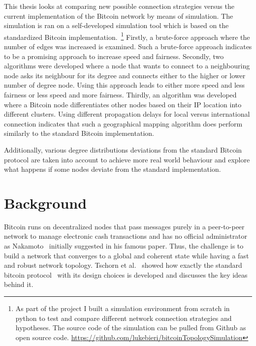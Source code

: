 \documentclass[a4paper, oneside]{discothesis}
\begin{document}
This thesis looks at comparing new possible connection strategies versus the current implementation of the Bitcoin network by means of simulation. The simulation is ran on a self-developed simulation tool which is based on the standardized Bitcoin implementation.~\footnote{As part of the project I built a simulation environment from scratch in python to test and compare different network connection strategies and hypotheses. The source code of the simulation can be pulled from Github as open source code. \url{https://github.com/lukebieri/bitcoinTopologySimulation}}
Firstly, a brute-force approach where the number of edges was increased is examined. Such a brute-force approach indicates to be a promising approach to increase speed and fairness.
Secondly, two algorithms were developed where a node that wants to connect to a neighbouring node asks its neighbour for its degree and connects either to the higher or lower number of degree node. Using this approach leads to either more speed and less fairness or less speed and more fairness.
Thirdly, an algorithm was developed where a Bitcoin node differentiates other nodes based on their IP location into different clusters. Using different propagation delays for local versus international connection indicates that such a geographical mapping algorithm does perform similarly to the standard Bitcoin implementation.

Additionally, various degree distributions deviations from the standard Bitcoin protocol are taken into account to achieve more real world behaviour and explore what happens if some nodes deviate from the standard implementation.

\chapter{Background}

Bitcoin runs on decentralized nodes that pass messages purely in a peer-to-peer network to manage electronic cash transactions and has no official administrator as Nakamoto~\cite{SatoshiPaper} initially suggested in his famous paper. Thus, the challenge is to build a network that converges to a global and coherent state while having a fast and robust network topology.
Tschorn et al.~\cite{BitcoinAndBeyond} showed how exactly the standard bitcoin protocol~\cite{GithubBitcoin} with its design choices is developed and discusses the key ideas behind it.
\end{document}
